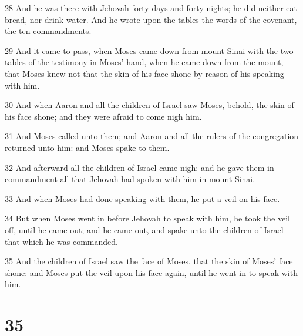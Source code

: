 \par 28 And he was there with Jehovah forty days and forty nights; he did neither eat bread, nor drink water. And he wrote upon the tables the words of the covenant, the ten commandments.
\par 29 And it came to pass, when Moses came down from mount Sinai with the two tables of the testimony in Moses' hand, when he came down from the mount, that Moses knew not that the skin of his face shone by reason of his speaking with him.
\par 30 And when Aaron and all the children of Israel saw Moses, behold, the skin of his face shone; and they were afraid to come nigh him.
\par 31 And Moses called unto them; and Aaron and all the rulers of the congregation returned unto him: and Moses spake to them.
\par 32 And afterward all the children of Israel came nigh: and he gave them in commandment all that Jehovah had spoken with him in mount Sinai.
\par 33 And when Moses had done speaking with them, he put a veil on his face.
\par 34 But when Moses went in before Jehovah to speak with him, he took the veil off, until he came out; and he came out, and spake unto the children of Israel that which he was commanded.
\par 35 And the children of Israel saw the face of Moses, that the skin of Moses' face shone: and Moses put the veil upon his face again, until he went in to speak with him.

\chapter{35}

